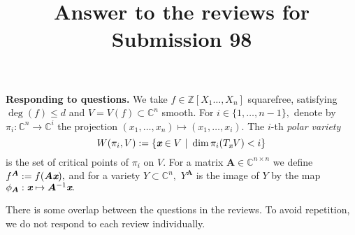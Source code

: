 \documentclass{article}
\def\mA{{\bm A}}
\def\xb{\textit{\textbf{x}}}
\def\C{\mathbb{C}}
\newcommand{\ZZ}{{\mathbb{Z}}}
\begin{document}
\title{Answer to the reviews for Submission 98}

\author{}
\date{}


\maketitle

\noindent \textbf{Responding to questions.} We take
$f\in\ZZ[X_1\hdots,X_n]$ squarefree, satisfying $\deg(f) \leq d$ and
$V=V(f) \subset \C^n$ smooth. For $i \in \{1,\hdots,n-1\},$ denote by
$\pi_i:\C^n \rightarrow \C^i$ the projection $(x_1,\hdots,x_n) \mapsto
(x_1,\hdots,x_i)$.  The $i$-th \textit{polar variety} \[W(\pi_i,V) :=
\{\xb \in V~|~\dim \pi_i(T_\xb V) < i\}\] is the set of critical
points of $\pi_i$ on $V$.
For a matrix $\mA \in \C^{n \times n}$ we define $f^\mA := f(\mA\xb),$
and for a variety $Y \subset \C^n,$ $Y^{\mA}$ is the image of $Y$ by
the map $\phi_{\mA} : \xb \mapsto \mA^{-1}\xb.$

There is some overlap between the questions in the reviews. To
avoid repetition, we do not respond to each review individually.
\end{document}
